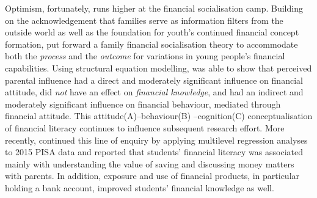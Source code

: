 \documentclass[a4paper,11pt,UKenglish,twoside,openright]{report}\usepackage[]{graphicx}\usepackage[]{color}
\begin{document}
Optimism, fortunately, runs higher at the financial socialisation camp. Building on the acknowledgement that families serve as information filters from the outside world \parencite{danes:2007} as well as the foundation for youth's continued financial concept formation, \textcite{gudmunson:2011} put forward a family financial socialisation theory to accommodate both the \emph{process} and the \emph{outcome} for variations in young people's financial capabilities. Using structural equation modelling, \textcite{jorgensen:2010} was able to show that perceived parental influence had a direct and moderately significant influence on financial attitude, did \emph{not} have an effect on \emph{financial knowledge}, and had an indirect and moderately significant influence on financial behaviour, mediated through financial attitude. This attitude(A)--behaviour(B)
--cognition(C) conceptualisation of financial literacy \parencite{potrich:2015} continues to influence subsequent research effort. More recently, \textcite{morenoherrero:2018a} continued this line of enquiry by applying multilevel regression analyses to 2015 PISA data and reported that students' financial literacy was associated mainly with understanding the value of saving and discussing money matters with parents. In addition, exposure and use of financial products, in particular holding a bank account, improved students' financial knowledge as well.
\end{document}
